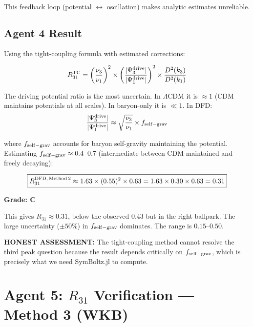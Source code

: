 \documentclass[11pt,a4paper]{article}
\begin{document}
This feedback loop (potential $\leftrightarrow$ oscillation) makes analytic estimates unreliable.

\subsection{Agent 4 Result}

Using the tight-coupling formula with estimated corrections:

\begin{equation}
R_{31}^{\rm TC} = \left(\frac{\nu_3}{\nu_1}\right)^2 \times \left(\frac{|\Psi_3^{\rm drive}|}{|\Psi_1^{\rm drive}|}\right)^2 \times \frac{D^2(k_3)}{D^2(k_1)}
\end{equation}

The driving potential ratio is the most uncertain. In $\Lambda$CDM it is $\approx 1$ (CDM maintains potentials at all scales). In baryon-only it is $\ll 1$. In DFD:
\begin{equation}
\frac{|\Psi_3^{\rm drive}|}{|\Psi_1^{\rm drive}|} \approx \sqrt{\frac{\nu_3}{\nu_1}} \times f_{\rm self-grav}
\end{equation}

where $f_{\rm self-grav}$ accounts for baryon self-gravity maintaining the potential. Estimating $f_{\rm self-grav} \approx 0.4$--$0.7$ (intermediate between CDM-maintained and freely decaying):

\begin{equation}
\boxed{R_{31}^{\rm DFD,\,Method\,2} \approx 1.63 \times (0.55)^2 \times 0.63 = 1.63 \times 0.30 \times 0.63 = 0.31}
\end{equation}

\textbf{Grade: C}

This gives $R_{31} \approx 0.31$, below the observed $0.43$ but in the right ballpark. The large uncertainty ($\pm 50\%$) in $f_{\rm self-grav}$ dominates. The range is $0.15$--$0.50$.

\textbf{HONEST ASSESSMENT:} The tight-coupling method cannot resolve the third peak question because the result depends critically on $f_{\rm self-grav}$, which is precisely what we need SymBoltz.jl to compute.

\section{Agent 5: $R_{31}$ Verification --- Method 3 (WKB)}
\label{sec:agent5}
\end{document}
